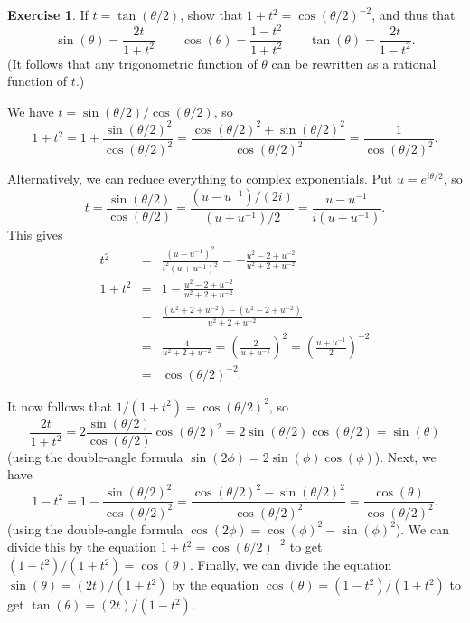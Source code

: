 \documentclass[a4paper]{amsart}
\theoremstyle{definition}
\newtheorem{exercise}{Exercise}[section]
\newenvironment{solution}{{\noindent \bf Solution:}}{}
\begin{document}
\begin{exercise}\label{ex-tanhalf}
If $t=\tan(\theta/2)$, show that $1+t^2=\cos(\theta/2)^{-2}$,
 and thus that
 \[ \sin(\theta)=\frac{2t}{1+t^2}    \hspace{2em}
    \cos(\theta)=\frac{1-t^2}{1+t^2} \hspace{2em}
    \tan(\theta)=\frac{2t}{1-t^2}.
 \]
 (It follows that any trigonometric function of $\theta$ can
 be rewritten as a rational function of $t$.)
\end{exercise}
\begin{solution}
We have $t=\sin(\theta/2)/\cos(\theta/2)$, so
 \[ 1 +t^2 = 1 + \frac{\sin(\theta/2)^2}{\cos(\theta/2)^2} =
     \frac{\cos(\theta/2)^2 + \sin(\theta/2)^2}{\cos(\theta/2)^2} 
      = \frac{1}{\cos(\theta/2)^2}.
 \]

 Alternatively, we can reduce everything to complex exponentials.
 Put $u=e^{i\theta/2}$, so 
 \[ t = \frac{\sin(\theta/2)}{\cos(\theta/2)}
      = \frac{(u-u^{-1})/(2i)}{(u+u^{-1})/2}
      = \frac{u-u^{-1}}{i(u+u^{-1})}.
 \]
 This gives
 \begin{eqnarray*}
  t^2
   &=& \frac{(u-u^{-1})^2}{i^2 (u+u^{-1})^2}
    =  -\frac{u^2-2+u^{-2}}{u^2+2+u^{-2}} \\
  1+t^2 
   &=& 1-\frac{u^2-2+u^{-2}}{u^2+2+u^{-2}} \\
   &=& \frac{(u^2+2+u^{-2})-(u^2-2+u^{-2})}{u^2+2+u^{-2}} \\
   &=& \frac{4}{u^2+2+u^{-2}}
    =  \left(\frac{2}{u+u^{-1}}\right)^2 
    =  \left(\frac{u+u^{-1}}{2}\right)^{-2} \\
   &=& \cos(\theta/2)^{-2}.
 \end{eqnarray*}
 
 It now follows that $1/(1+t^2)=\cos(\theta/2)^2$, so 
 \[ \frac{2t}{1+t^2} =
     2\frac{\sin(\theta/2)}{\cos(\theta/2)}\cos(\theta/2)^2
     = 2\sin(\theta/2)\cos(\theta/2) = \sin(\theta)
 \]
 (using the double-angle formula
 $\sin(2\phi)=2\sin(\phi)\cos(\phi)$).  Next, we have 
 \[ 1-t^2 = 1 - \frac{\sin(\theta/2)^2}{\cos(\theta/2)^2} =
     \frac{\cos(\theta/2)^2 - \sin(\theta/2)^2}{\cos(\theta/2)^2} 
      = \frac{\cos(\theta)}{\cos(\theta/2)^2}.
 \]
 (using the double-angle formula
 $\cos(2\phi)=\cos(\phi)^2-\sin(\phi)^2$).  We can divide
 this by the equation $1+t^2=\cos(\theta/2)^{-2}$ to get
 $(1-t^2)/(1+t^2)=\cos(\theta)$.  Finally, we can divide the
 equation $\sin(\theta)=(2t)/(1+t^2)$ by the equation
 $\cos(\theta)=(1-t^2)/(1+t^2)$ to get $\tan(\theta)=(2t)/(1-t^2)$.
\end{solution}
\end{document}

